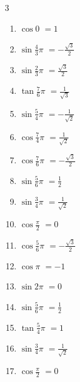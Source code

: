 \begin{multicols}{3}
\begin{enumerate}
  \item $\displaystyle \cos{0}$
        $\displaystyle =1$

  \item $\displaystyle \sin{\frac{4}{3}\pi}$
        $\displaystyle =-\frac{\sqrt{3}}{2}$

  \item $\displaystyle \sin{\frac{2}{3}\pi}$
        $\displaystyle =\frac{\sqrt{3}}{2}$

  \item $\displaystyle \tan{\frac{7}{6}\pi}$
        $\displaystyle =\frac{1}{\sqrt{3}}$

  \item $\displaystyle \sin{\frac{5}{4}\pi}$
        $\displaystyle =-\frac{1}{\sqrt{2}}$

  \item $\displaystyle \cos{\frac{7}{4}\pi}$
        $\displaystyle =\frac{1}{\sqrt{2}}$

  \item $\displaystyle \cos{\frac{7}{6}\pi}$
        $\displaystyle =-\frac{\sqrt{3}}{2}$

  \item $\displaystyle \sin{\frac{5}{6}\pi}$
        $\displaystyle =\frac{1}{2}$

  \item $\displaystyle \sin{\frac{3}{4}\pi}$
        $\displaystyle =\frac{1}{\sqrt{2}}$

  \item $\displaystyle \cos{\frac{\pi}{2}}$
        $\displaystyle =0$

  \item $\displaystyle \cos{\frac{5}{6}\pi}$
        $\displaystyle =-\frac{\sqrt{3}}{2}$

  \item $\displaystyle \cos{\pi}$
        $\displaystyle =-1$

  \item $\displaystyle \sin{2\pi}$
        $\displaystyle =0$

  \item $\displaystyle \sin{\frac{5}{6}\pi}$
        $\displaystyle =\frac{1}{2}$

  \item $\displaystyle \tan{\frac{5}{4}\pi}$
        $\displaystyle =1$

  \item $\displaystyle \sin{\frac{3}{4}\pi}$
        $\displaystyle =\frac{1}{\sqrt{2}}$

  \item $\displaystyle \cos{\frac{\pi}{2}}$
        $\displaystyle =0$


\end{enumerate}
\end{multicols}
